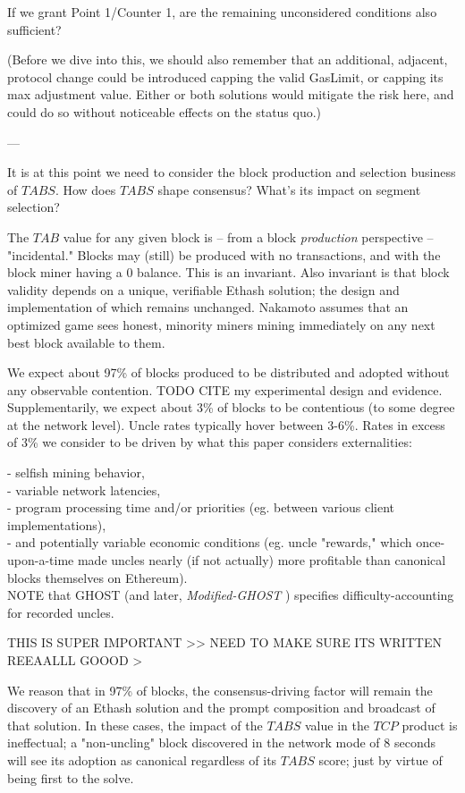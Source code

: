 \documentclass[11pt]{article}
\theoremstyle{plain}
\newcommand{\mghost}{\textit{Modified-GHOST }}
\begin{document}
{If we grant Point 1/Counter 1, are the remaining unconsidered conditions also
sufficient?

(Before we dive into this, we should also remember that an additional,
adjacent, protocol change could be introduced capping the valid GasLimit, or
capping its max adjustment value. Either or both solutions would mitigate the
risk here, and could do so without noticeable effects on the status quo.)

---

It is at this point we need to consider the block production and selection
business of $TABS$.
How does $TABS$ shape consensus? What's its impact on segment selection?

The $TAB$ value for any given block is -- from a block \textit{production}
perspective -- "incidental."
Blocks may (still) be produced with no transactions, and with the block miner
having a 0 balance. This is an invariant.
Also invariant is that block validity depends on a unique, verifiable Ethash
solution; the design and implementation of which remains unchanged.
Nakamoto assumes that an optimized game sees honest, minority miners mining
immediately on any next best block available to them.

We expect about 97\% of blocks produced to be distributed and adopted without
any observable contention. TODO CITE my experimental design and evidence.
Supplementarily, we expect about 3\% of blocks to be contentious (to some
degree at the network level).
Uncle rates typically hover between 3-6\%. Rates in excess of 3\% we consider
to be driven by what this paper considers externalities:

- selfish mining behavior, \\
- variable network latencies, \\
- program processing time and/or priorities (eg. between various client
implementations), \\
- and potentially variable economic conditions (eg. uncle "rewards," which
once-upon-a-time made uncles nearly (if not actually) more profitable than
canonical blocks themselves on Ethereum). \\

NOTE that GHOST (and later, \mghost) specifies difficulty-accounting
for recorded uncles.

THIS IS SUPER IMPORTANT >> NEED TO MAKE SURE ITS WRITTEN REEAALLL GOOOD >

We reason that in 97\% of blocks, the consensus-driving factor will remain the
discovery of an Ethash solution and the prompt composition and broadcast of
that solution.
In these cases, the impact of the $TABS$ value in the $TCP$ product is
ineffectual; a "non-uncling" block discovered in the network mode of 8 seconds
will see
its adoption as canonical regardless of its $TABS$ score; just by virtue of
being first to the solve.

}
\end{document}
